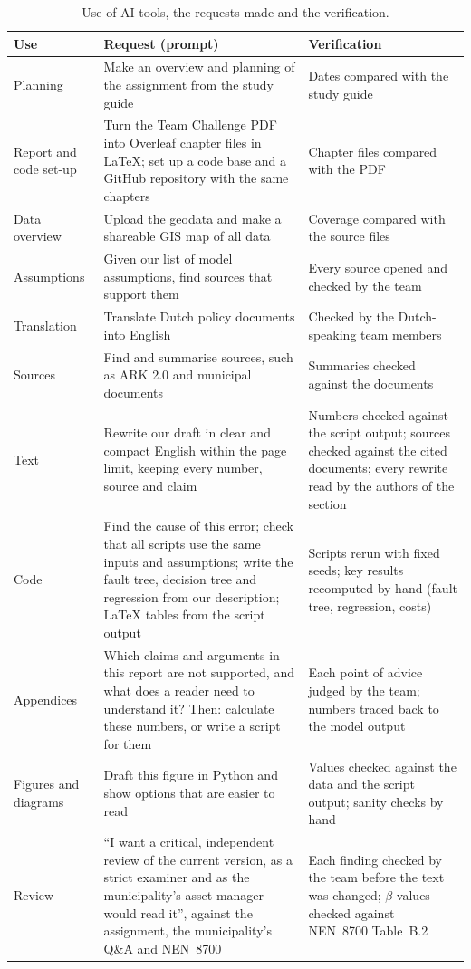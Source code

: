 \begin{table}[htbp]
\centering
\small
\caption{Use of AI tools, the requests made and the verification.}
\label{tab:ai-use}
\begin{tabularx}{\textwidth}{@{}>{\raggedright\arraybackslash}p{3.6cm}
  >{\raggedright\arraybackslash}X >{\raggedright\arraybackslash}p{5.0cm}@{}}
\toprule
Use & Request (prompt) & Verification \\
\midrule
Planning & Make an overview and planning of the assignment from the study guide & Dates compared with the study guide \\
Report and code set-up & Turn the Team Challenge PDF into Overleaf chapter files in LaTeX; set up a code base and a GitHub repository with the same chapters & Chapter files compared with the PDF \\
Data overview & Upload the geodata and make a shareable GIS map of all data & Coverage compared with the source files \\
Assumptions & Given our list of model assumptions, find sources that support them & Every source opened and checked by the team \\
Translation & Translate Dutch policy documents into English & Checked by the Dutch-speaking team members \\
Sources & Find and summarise sources, such as ARK 2.0 and municipal documents & Summaries checked against the documents \\
Text & Rewrite our draft in clear and compact English within the page limit, keeping every number, source and claim & Numbers checked against the script output; sources checked against the cited documents; every rewrite read by the authors of the section \\
Code & Find the cause of this error; check that all scripts use the same inputs and assumptions; write the fault tree, decision tree and regression from our description; LaTeX tables from the script output & Scripts rerun with fixed seeds; key results recomputed by hand (fault tree, regression, costs) \\
Appendices & Which claims and arguments in this report are not supported, and what does a reader need to understand it? Then: calculate these numbers, or write a script for them & Each point of advice judged by the team; numbers traced back to the model output \\
Figures and diagrams & Draft this figure in Python and show options that are easier to read & Values checked against the data and the script output; sanity checks by hand \\
Review & ``I want a critical, independent review of the current version, as a strict examiner and as the municipality's asset manager would read it'', against the assignment, the municipality's Q\&A and NEN~8700 & Each finding checked by the team before the text was changed; $\beta$ values checked against NEN~8700 Table~B.2 \\
\bottomrule
\end{tabularx}
\end{table}

